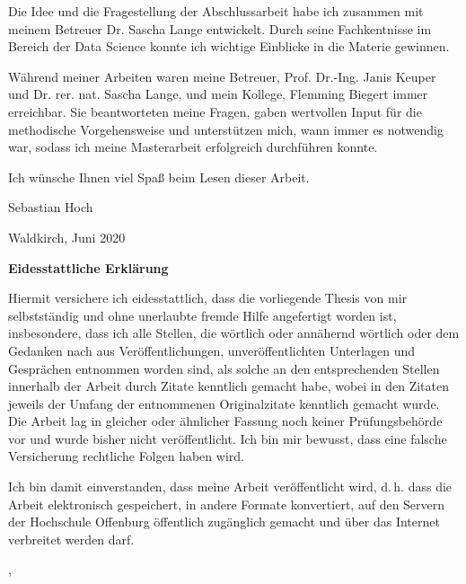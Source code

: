 Die Idee und die Fragestellung der Abschlussarbeit habe ich zusammen mit meinem Betreuer Dr. Sascha Lange entwickelt. Durch seine Fachkentnisse im Bereich der Data Science konnte ich wichtige Einblicke in die Materie gewinnen.

Während meiner Arbeiten waren meine Betreuer, Prof. Dr.-Ing. Janis Keuper und Dr. rer. nat. Sascha Lange, und mein Kollege, Flemming Biegert immer erreichbar. Sie beantworteten meine Fragen, gaben wertvollen Input für die methodische Vorgehensweise und unterstützen mich, wann immer es notwendig war, sodass ich meine Masterarbeit erfolgreich durchführen konnte.

Ich wünsche Ihnen viel Spaß beim Lesen dieser Arbeit.

Sebastian Hoch 

Waldkirch, Juni 2020

\clearpage
\thispagestyle{empty}
\textsf{\large\textbf{Eidesstattliche Erklärung}}

Hiermit versichere ich eidesstattlich, dass die vorliegende Thesis von mir selbstständig und ohne unerlaubte fremde Hilfe angefertigt worden ist, insbesondere, dass ich alle Stellen, die wörtlich oder annähernd wörtlich oder dem Gedanken nach aus Veröffentlichungen, unveröffentlichten Unterlagen und Gesprächen entnommen worden sind, als solche an den entsprechenden Stellen innerhalb der Arbeit durch Zitate kenntlich gemacht habe, wobei in den Zitaten jeweils der Umfang der entnommenen Originalzitate kenntlich gemacht wurde. Die Arbeit lag in gleicher oder ähnlicher Fassung noch keiner Prüfungsbehörde vor und wurde bisher nicht veröffentlicht. Ich bin mir bewusst, dass eine falsche Versicherung rechtliche Folgen haben wird.

%
{
\vspace{0.5cm}
Ich bin damit einverstanden, dass meine Arbeit veröffentlicht wird, d.\,h. dass die Arbeit elektronisch gespeichert, in andere Formate konvertiert, auf den Servern der Hochschule Offenburg öffentlich zugänglich gemacht und über das Internet verbreitet werden darf. 
}{}%


\vspace{1cm}
\hsmaort, \hsmadatum \\

\vspace{1.2cm}						                                      
\hsmaautor


